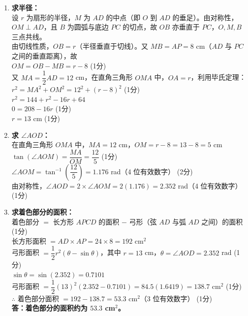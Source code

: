 \documentclass[12pt,a4paper]{exam-zh}
\begin{document}
\begin{solution}
    \begin{enumerate}[label=(\alph*)]
        \item \textbf{求半径：} \\
        设 $r$ 为扇形的半径，$M$ 为 $AD$ 的中点（即 $O$ 到 $AD$ 的垂足）。由对称性，$OM \perp AD$，且 $B$ 为圆弧与底边 $PC$ 的切点，故 $OB$ 亦垂直于 $PC$，$O, M, B$ 三点共线。 \\
        由切线性质，$OB = r$（半径垂直于切线）。又 $MB = AP = 8$ cm（$AD$ 与 $PC$ 之间的垂直距离），故 \\
        $OM = OB - MB = r - 8$ \hfill (1分) \\
        又 $MA = \dfrac{1}{2}AD = 12$ cm，在直角三角形 $OMA$ 中，$OA = r$，利用毕氏定理： \\
        $r^2 = MA^2 + OM^2 = 12^2 + (r - 8)^2$ \hfill (1分) \\
        $r^2 = 144 + r^2 - 16r + 64$ \\
        $0 = 208 - 16r$ \hfill (1分) \\
        $r = 13$ cm \hfill (1分)

        \item \textbf{求 $\angle AOD$：} \\
        在直角三角形 $OMA$ 中，$MA = 12$ cm，$OM = r - 8 = 13 - 8 = 5$ cm \\
        $\tan(\angle AOM) = \dfrac{MA}{OM} = \dfrac{12}{5}$ \hfill (1分) \\
        $\angle AOM = \tan^{-1}\left(\dfrac{12}{5}\right) = 1.176$ rad（4 位有效数字） \hfill (2分) \\
        由对称性，$\angle AOD = 2 \times \angle AOM = 2(1.176) = 2.352$ rad（4 位有效数字） \hfill (1分)

        \item \textbf{求着色部分的面积：} \\
        着色部分 $=$ 长方形 $APCD$ 的面积 $-$ 弓形（弦 $AD$ 与弧 $AD$ 之间）的面积 \hfill (1分) \\
        长方形面积 $= AD \times AP = 24 \times 8 = 192$ cm$^2$ \\
        弓形面积 $= \dfrac{1}{2}r^2(\theta - \sin\theta)$，其中 $r = 13$ cm，$\theta = \angle AOD = 2.352$ rad \hfill (1分) \\
        $\sin\theta = \sin(2.352) = 0.7101$ \\
        弓形面积 $= \dfrac{1}{2}(13)^2(2.352 - 0.7101) = 84.5(1.6419) = 138.7$ cm$^2$ \hfill (1分) \\
        $\therefore$ 着色部分面积 $= 192 - 138.7 = 53.3$ cm$^2$（3 位有效数字） \hfill (1分) \\
        \textbf{答：着色部分的面积约为 $53.3$ cm$^2$。}
    \end{enumerate}
\end{solution}
\end{document}
